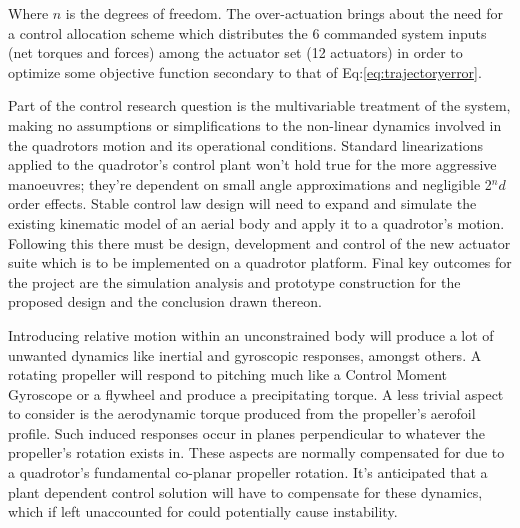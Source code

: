 Where $n$ is the degrees of freedom. The over-actuation brings about the need for a control allocation scheme which distributes the 6 commanded system inputs (net torques and forces) among the actuator set (12 actuators) in order to optimize some objective function secondary to that of Eq:\ref{eq:trajectoryerror}.
\par
Part of the control research question is the multivariable treatment of the system, making no assumptions or simplifications to the non-linear dynamics involved in the quadrotors motion and its operational conditions. Standard linearizations applied to the quadrotor's control plant won't hold true for the more aggressive manoeuvres; they're dependent on small angle approximations and negligible 2$^nd$ order effects. Stable control law design will need to expand and simulate the existing kinematic model of an aerial body and apply it to a quadrotor's motion. Following this there must be design, development and control of the new actuator suite which is to be implemented on a quadrotor platform. Final key outcomes for the project are the simulation analysis and prototype construction for the proposed design and the conclusion drawn thereon.
\par
Introducing relative motion within an unconstrained body will produce a lot of unwanted dynamics like inertial and gyroscopic responses, amongst others. A rotating propeller will respond to pitching much like a Control Moment Gyroscope \cite{cmg} or a flywheel and produce a precipitating torque. A less trivial aspect to consider is the aerodynamic torque produced from the propeller's aerofoil profile. Such induced responses occur in planes perpendicular to whatever the propeller's rotation exists in. These aspects are normally compensated for due to a quadrotor's fundamental co-planar propeller rotation. It's anticipated that a plant dependent control solution will have to compensate for these dynamics, which if left unaccounted for could potentially cause instability.
